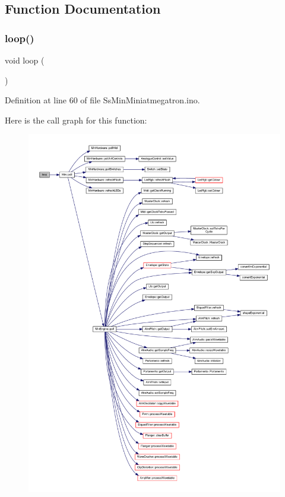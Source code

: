 \subsection{Function Documentation}
\mbox{\label{_ss_min_miniatmegatron_8ino_afe461d27b9c48d5921c00d521181f12f}} 
\subsubsection{\texorpdfstring{loop()}{loop()}}
{\footnotesize\ttfamily void loop (\begin{DoxyParamCaption}{ }\end{DoxyParamCaption})}



Definition at line 60 of file Ss\+Min\+Miniatmegatron.\+ino.

Here is the call graph for this function\+:
\nopagebreak
\begin{figure}[H]
\begin{center}
\leavevmode
\includegraphics[width=350pt]{_ss_min_miniatmegatron_8ino_afe461d27b9c48d5921c00d521181f12f_cgraph}
\end{center}
\end{figure}
\mbox{\label{_ss_min_miniatmegatron_8ino_a4fc01d736fe50cf5b977f755b675f11d}} 
